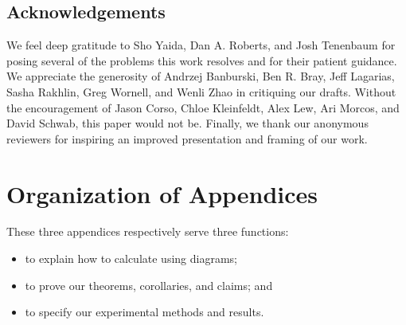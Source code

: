 \documentclass{article}
\theoremstyle{plain}
\theoremstyle{definition}
\begin{document}
\subsection{Acknowledgements}
    We feel deep gratitude to
        Sho Yaida,
        Dan A. Roberts, and
        Josh Tenenbaum
    for posing several of the problems this work resolves and for their
    patient guidance.  We appreciate the generosity of
        Andrzej Banburski,
        Ben R. Bray,
        Jeff Lagarias,
        Sasha Rakhlin,
        Greg Wornell, and
        Wenli Zhao
    in critiquing our drafts.
    Without the encouragement of
        Jason Corso,
        Chloe Kleinfeldt,
        Alex Lew, 
        Ari Morcos, and
        David Schwab,
    this paper would not be.
    Finally, we thank our anonymous reviewers for inspiring an improved
    presentation and framing of our work.


    
    


\clearpage
\newpage
\renewcommand{\thesection}{\Alph{section}}
\setcounter{section}{0}

\section*{Organization of Appendices}
    These three appendices respectively serve three functions:
    \begin{itemize}
        \item to explain how to calculate using diagrams;
        \item to prove our theorems, corollaries, and claims; and
        \item to specify our experimental methods and results.
    \end{itemize}
\end{document}
